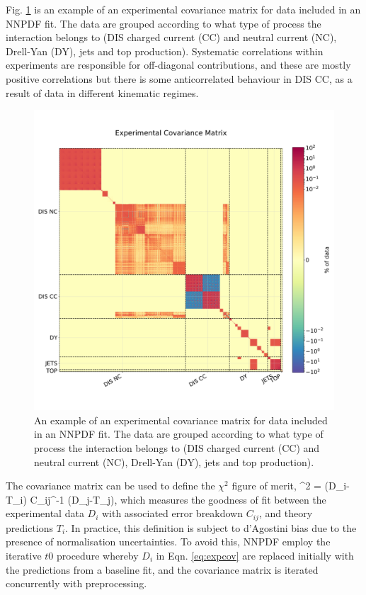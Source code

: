 Fig. \ref{fig:expcovmat} is an example of an experimental covariance matrix for data included in an NNPDF fit. The data are grouped according to what type of process the interaction belongs to (DIS charged current (CC) and neutral current (NC), Drell-Yan (DY), jets and top production). Systematic correlations within experiments are responsible for off-diagonal contributions, and these are mostly positive correlations but there is some anticorrelated behaviour in DIS CC, as a result of data in different kinematic regimes. 

\begin{figure}
\centering
\includegraphics[width=15cm]{background/exp_covmat.pdf}
\caption{An example of an experimental covariance matrix for data included in an NNPDF fit. The data are grouped according to what type of process the interaction belongs to (DIS charged current (CC) and neutral current (NC), Drell-Yan (DY), jets and top production).}
\label{fig:expcovmat}
\end{figure}

The covariance matrix can be used to define the $\chi^2$ figure of merit, 
\be
\label{eqn:chi2}
\chi^2 =  (D_i-T_i) C_{ij}^{-1} (D_j-T_j),
\ee
which measures the goodness of fit between the experimental data $D_i$ with associated error breakdown $C_{ij}$, and theory predictions $T_i$. In practice, this definition is subject to d'Agostini bias \cite{DAgostini:1993arp} due to the presence of normalisation uncertainties. To avoid this, NNPDF employ the iterative $t0$ procedure \cite{Ball:2009qv} whereby $D_i$ in Eqn. \ref{eq:expcov} are replaced initially with the predictions from a baseline fit, and the covariance matrix is iterated concurrently with preprocessing. 


